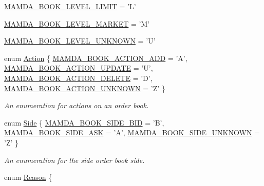 \begin{CompactItemize}
\item 
\hyperlink{classWombat_1_1MamdaOrderBookTypes_b1b75d93c83c5a1042c392ab46a2729154ced231e34205e73455fc9c3fcd0874}{MAMDA\_\-BOOK\_\-LEVEL\_\-LIMIT} = 'L'
\item 
\hyperlink{classWombat_1_1MamdaOrderBookTypes_b1b75d93c83c5a1042c392ab46a2729111e98055b373d210242bd004151cf4e0}{MAMDA\_\-BOOK\_\-LEVEL\_\-MARKET} = 'M'
\item 
\hyperlink{classWombat_1_1MamdaOrderBookTypes_b1b75d93c83c5a1042c392ab46a27291b7d57a8b905d6ea9a0c1b10747b54bdc}{MAMDA\_\-BOOK\_\-LEVEL\_\-UNKNOWN} = 'U'
\item 
enum \hyperlink{classWombat_1_1MamdaOrderBookTypes_674fcb8aae6f411d51060acc45b6c11e}{Action} \{ \hyperlink{classWombat_1_1MamdaOrderBookTypes_674fcb8aae6f411d51060acc45b6c11eea055995d49fd15e831c1e4fe2f4679e}{MAMDA\_\-BOOK\_\-ACTION\_\-ADD} =  'A', 
\hyperlink{classWombat_1_1MamdaOrderBookTypes_674fcb8aae6f411d51060acc45b6c11ecbd438722f7ccf88ebbe7e670fff1089}{MAMDA\_\-BOOK\_\-ACTION\_\-UPDATE} =  'U', 
\hyperlink{classWombat_1_1MamdaOrderBookTypes_674fcb8aae6f411d51060acc45b6c11e4e17dea22867ea0daf0a6a3747c7240f}{MAMDA\_\-BOOK\_\-ACTION\_\-DELETE} =  'D', 
\hyperlink{classWombat_1_1MamdaOrderBookTypes_674fcb8aae6f411d51060acc45b6c11e768e0d111850adb548026aee2c659d75}{MAMDA\_\-BOOK\_\-ACTION\_\-UNKNOWN} =  'Z'
 \}
\begin{CompactList}\small\item\em An enumeration for actions on an order book. \item\end{CompactList}\item 
enum \hyperlink{classWombat_1_1MamdaOrderBookTypes_87019addc1047d47d704b15510139343}{Side} \{ \hyperlink{classWombat_1_1MamdaOrderBookTypes_87019addc1047d47d704b155101393437db44a272d8806d33943b7e6fad90ac2}{MAMDA\_\-BOOK\_\-SIDE\_\-BID} =  'B', 
\hyperlink{classWombat_1_1MamdaOrderBookTypes_87019addc1047d47d704b1551013934341720355a266d11f5c17a44e90883e68}{MAMDA\_\-BOOK\_\-SIDE\_\-ASK} =  'A', 
\hyperlink{classWombat_1_1MamdaOrderBookTypes_87019addc1047d47d704b15510139343ccb0ae3d2e7174ab40f253fa7a3c9896}{MAMDA\_\-BOOK\_\-SIDE\_\-UNKNOWN} =  'Z'
 \}
\begin{CompactList}\small\item\em An enumeration for the side order book side. \item\end{CompactList}\item 
enum \hyperlink{classWombat_1_1MamdaOrderBookTypes_a1147c14315f68b9371c92a6a259fbd5}{Reason} \{ \par

\end{CompactItemize}
